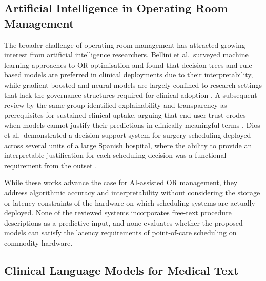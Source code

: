 \subsection{Artificial Intelligence in Operating Room Management}
\label{sec:rw_or}

The broader challenge of operating room management has attracted growing interest from artificial intelligence researchers. Bellini et al.\ surveyed machine learning approaches to OR optimisation and found that decision trees and rule-based models are preferred in clinical deployments due to their interpretability, while gradient-boosted and neural models are largely confined to research settings that lack the governance structures required for clinical adoption \cite{bellini2020artificial}. A subsequent review by the same group identified explainability and transparency as prerequisites for sustained clinical uptake, arguing that end-user trust erodes when models cannot justify their predictions in clinically meaningful terms \cite{bellini2024artificial}. Dios et al.\ demonstrated a decision support system for surgery scheduling deployed across several units of a large Spanish hospital, where the ability to provide an interpretable justification for each scheduling decision was a functional requirement from the outset \cite{dios2015decision}.

While these works advance the case for AI-assisted OR management, they address algorithmic accuracy and interpretability without considering the storage or latency constraints of the hardware on which scheduling systems are actually deployed. None of the reviewed systems incorporates free-text procedure descriptions as a predictive input, and none evaluates whether the proposed models can satisfy the latency requirements of point-of-care scheduling on commodity hardware.

\subsection{Clinical Language Models for Medical Text}
\label{sec:rw_clm}

